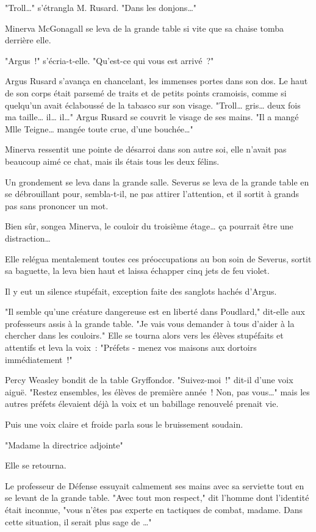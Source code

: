 "Troll…" s'étrangla M. Rusard. "Dans les donjons…"

Minerva McGonagall se leva de la grande table si vite que sa chaise tomba derrière elle.

"Argus~!" s'écria-t-elle. "Qu'est-ce qui vous est arrivé~?"

Argus Rusard s'avança en chancelant, les immenses portes dans son dos. Le haut de son corps était parsemé de traits et de petits points cramoisis, comme si quelqu'un avait éclaboussé de la tabasco sur son visage. "Troll… gris… deux fois ma taille… il… il…" Argus Rusard se couvrit le visage de ses mains. "Il a mangé Mlle Teigne… mangée toute crue, d'une bouchée…"

Minerva ressentit une pointe de désarroi dans son autre soi, elle n'avait pas beaucoup aimé ce chat, mais ils étais tous les deux félins.

Un grondement se leva dans la grande salle. Severus se leva de la grande table en se débrouillant pour, sembla-t-il, ne pas attirer l'attention, et il sortit à grands pas sans prononcer un mot.

Bien sûr, songea Minerva, le couloir du troisième étage… ça pourrait être une distraction…

Elle relégua mentalement toutes ces préoccupations au bon soin de Severus, sortit sa baguette, la leva bien haut et laissa échapper cinq jets de feu violet.

Il y eut un silence stupéfait, exception faite des sanglots hachés d'Argus.

"Il semble qu'une créature dangereuse est en liberté dans Poudlard," dit-elle aux professeurs assis à la grande table. "Je vais vous demander à tous d'aider à la chercher dans les couloirs." Elle se tourna alors vers les élèves stupéfaits et attentifs et leva la voix~: "Préfets - menez vos maisons aux dortoirs immédiatement~!"

Percy Weasley bondit de la table Gryffondor. "Suivez-moi~!" dit-il d'une voix aiguë. "Restez ensembles, les élèves de première année~! Non, pas vous…" mais les autres préfets élevaient déjà la voix et un babillage renouvelé prenait vie.

Puis une voix claire et froide parla sous le bruissement soudain.

"Madame la directrice adjointe"

Elle se retourna.

Le professeur de Défense essuyait calmement ses mains avec sa serviette tout en se levant de la grande table. "Avec tout mon respect," dit l'homme dont l'identité était inconnue, "vous n'êtes pas experte en tactiques de combat, madame. Dans cette situation, il serait plus sage de …"

